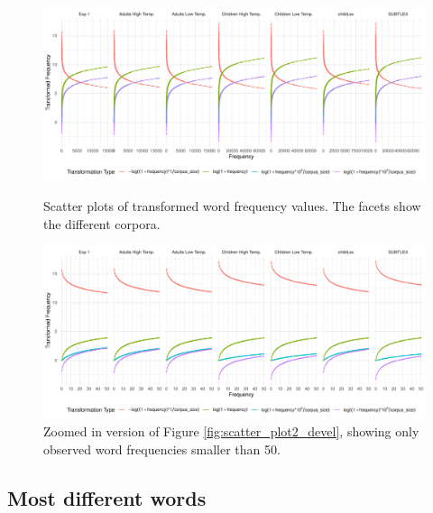 \documentclass[doc, a4paper, anonymous]{apa7}
\begin{document}
\begin{figure}[!htbp]
    \begin{minipage}[t]{1\textwidth}
    \includegraphics[width = 0.8\paperwidth]{figures/scatter_plot2_devel.pdf}
    \caption{ Scatter plots of transformed word frequency values. The facets show the different corpora.}
    \label{fig:scatter_plot2_devel}




    \includegraphics[width = 0.8\paperwidth]{figures/scatter_plot_devel.pdf}
    \caption{ Zoomed in version of Figure \ref{fig:scatter_plot2_devel}, showing only observed word frequencies smaller than 50.}
    \label{fig:scatter_plot_devel}
  \end{minipage}
\end{figure}

\clearpage


\subsection{Most different words}
\end{document}
